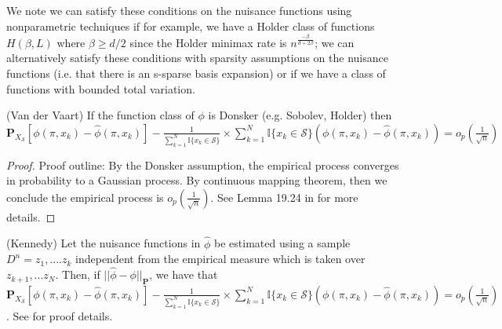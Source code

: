 We note we can satisfy these conditions on the nuisance functions using nonparametric techniques if for example, we have a Holder class of functions $H(\beta, L)$ where $\beta \geq d/2$ since the Holder minimax rate is $n^{\frac{-\beta}{d+2\beta}}$; we can alternatively satisfy these conditions with sparsity assumptions on the nuisance functions (i.e. that there is an s-sparse basis expansion) or if we have a class of functions with bounded total variation.

\begin{lemma} \label{vandervaart}
(Van der Vaart) If the function class of $\phi$ is Donsker (e.g. Sobolev, Holder) then $\mathbf{P}_{X_\mathcal{S}} \left[ \phi(\pi, x_k) - \widehat{\phi}(\pi, x_k) \right] - \frac{1}{\sum_{k=1}^N \mathbb{I}{\{x_k \in \mathcal{S} \}}}  
\times \sum_{k=1}^{N }\mathbb{I}{\{x_k \in \mathcal{S} \}} \left(\phi(\pi, x_k) - \widehat{\phi} (\pi, x_k) \right) = o_p(\frac{1}{\sqrt{n}})$
\end{lemma}
\begin{proof}
Proof outline: By the Donsker assumption, the empirical process converges in probability to a Gaussian process. By continuous mapping theorem, then we conclude the empirical process is $o_p(\frac{1}{\sqrt{n}})$. See Lemma 19.24 in \cite{van2000asymptotic} for more details.
\end{proof}

\begin{lemma} \label{kennedy}
(Kennedy) Let the nuisance functions in $\hat{\phi}$ be estimated using a sample $D^n= z_1,.... z_k$ independent from the empirical measure which is taken over $z_{k+1}, ... z_N$. Then, if $|| \hat{\phi} - \phi||_{\mathbf{P}}$, we have that  $\mathbf{P}_{X_\mathcal{S}} \left[ \phi(\pi, x_k) - \widehat{\phi}(\pi, x_k) \right] - \frac{1}{\sum_{k=1}^N \mathbb{I}{\{x_k \in \mathcal{S} \}}}  
\times \sum_{k=1}^{N }\mathbb{I}{\{x_k \in \mathcal{S} \}} \left(\phi(\pi, x_k) - \widehat{\phi} (\pi, x_k) \right) = o_p(\frac{1}{\sqrt{n}})$. See \cite{kennedy2018sharp} for proof details.
\end{lemma}











